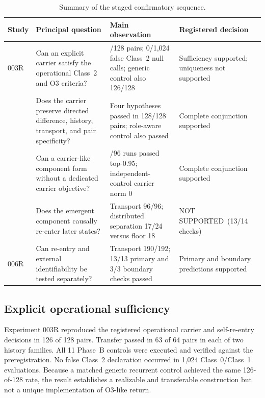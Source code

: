 \documentclass[11pt,a4paper]{article}
\newcommand{\statusnotsupported}{\textsf{NOT SUPPORTED}}
\begin{document}
\begin{table}[H]
\centering
\footnotesize
\caption{Summary of the staged confirmatory sequence.}
\label{tab:summary}
\begin{tabular}{@{}>{\raggedright\arraybackslash}p{1.15cm}>{\raggedright\arraybackslash}p{5.25cm}>{\raggedright\arraybackslash}p{4.9cm}>{\raggedright\arraybackslash}p{2.45cm}@{}}
\toprule
Study & Principal question & Main observation & Registered decision \\
\midrule
003R & Can an explicit carrier satisfy the operational Class~2 and O3 criteria? & 126/128 pairs; 0/1,024 false Class~2 null calls; generic control also 126/128 & Sufficiency supported; uniqueness not supported \\
004 & Does the carrier preserve directed difference, history, transport, and pair specificity? & Four hypotheses passed in 128/128 pairs; role-aware control also passed & Complete conjunction supported \\
005 & Can a carrier-like component form without a dedicated carrier objective? & 84/96 runs passed top-0.95; independent-control carrier norm 0 & Complete conjunction supported \\
006 & Does the emergent component causally re-enter later states? & Transport 96/96; distributed separation 17/24 versus floor 18 & \statusnotsupported\ (13/14 checks) \\
006R & Can re-entry and external identifiability be tested separately? & Transport 190/192; 13/13 primary and 3/3 boundary checks passed & Primary and boundary predictions supported \\
\bottomrule
\end{tabular}
\end{table}

\subsection{Explicit operational sufficiency}

Experiment 003R reproduced the registered operational carrier and self-re-entry decisions in 126 of 128 pairs. Transfer passed in 63 of 64 pairs in each of two history families. All 11 Phase~B controls were executed and verified against the preregistration. No false Class~2 declaration occurred in 1,024 Class~0/Class~1 evaluations. Because a matched generic recurrent control achieved the same 126-of-128 rate, the result establishes a realizable and transferable construction but not a unique implementation of O3-like return.
\end{document}
